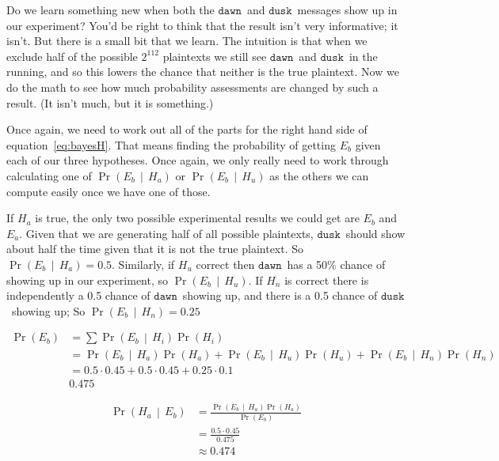 \documentclass[11pt]{article}
\newcommand{\prob}[1]{\ensuremath{\operatorname{Pr}\left( #1 \right)}}
\newcommand{\condprob}[2]{\prob{#1\, \middle|\, #2}}
\newcommand\mdusk{\ensuremath{\mathtt{dusk}}}
\newcommand\mdawn{\ensuremath{\mathtt{dawn}}}
\begin{document}
Do we learn something new when both the \mdawn\ and \mdusk\ messages show up in our experiment? You'd be right to think that the result isn't very informative; it isn't. But there is a small bit that we learn.
The intuition is that when we exclude half of the possible $2^112$ plaintexts we still see \mdawn\ and \mdusk\ in the running, and so this lowers the chance that neither is the true plaintext. Now we do the math to see how much probability assessments are changed by such a result. (It isn't much, but it is something.)

Once again, we need to work out all of the parts for the right hand side of equation~\ref{eq:bayesH}. That means finding the probability of getting $E_b$ given each of our three hypotheses. Once again, we only really need to work through calculating one of \condprob{E_b}{H_a} or \condprob{E_b}{H_u} as the others we can compute easily once we have one of those.

If $H_a$ is true, the only two possible experimental results we could get are  $E_b$ and $E_a$. Given that we are generating half of all possible plaintexts, \mdusk\ should show about half the time given that it is not the true plaintext. So $\condprob{E_b}{H_a} = 0.5$.
Similarly, if $H_u$ correct then \mdawn\ has a 50\% chance of showing up in our experiment, so \condprob{E_b}{H_u}.
If $H_n$ is correct there is independently a 0.5 chance of \mdawn\ showing up, and there is a 0.5 chance of \mdusk\ showing up;
So $\condprob{E_b}{H_n} = 0.25$

\begin{equation}
    \begin{split}
        \prob{E_b}  &= \sum \condprob{E_b}{H_i}\prob{H_i} \\
                    &= \condprob{E_b}{H_a}\prob{H_a}
                        + \condprob{E_b}{H_u}\prob{H_u}
                        + \condprob{E_b}{H_n}\prob{H_n} \\
                    &= 0.5 \cdot 0.45 + 0.5 \cdot 0.45 + 0.25 \cdot 0.1 \\
                    & 0.475
    \end{split}
\end{equation}

\begin{equation}
    \begin{split}
        \condprob{H_a}{E_b}
            &= \frac{\condprob{E_b}{H_a}\prob{H_a}}{\prob{E_b}} \\
            &= \frac{0.5 \cdot 0.45}{0.475} \\
            &\approx 0.474
    \end{split}
\end{equation}
\end{document}
